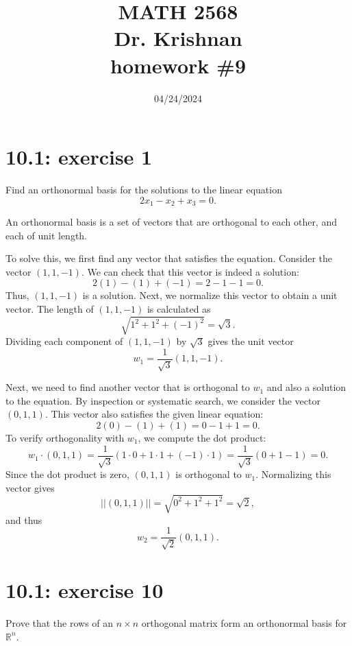 \documentclass{report}
\title{\Huge{MATH 2568}\\\huge{Dr. Krishnan}\\homework \#9}
\author{\Huge{\mylink{https://www.sohumsuthar.com}{Sohum Suthar}}}
\date{\huge {04/24/2024}}
\begin{document}
\maketitle
\newpage
{}	
\tableofcontents
\pagebreak





\section*{10.1: exercise 1} 

Find an orthonormal basis for the solutions to the linear equation
\[
2x_1 - x_2 + x_3 = 0.
\]


\sol

An orthonormal basis is a set of vectors that are orthogonal to each other, and each of unit length. 

To solve this, we first find any vector that satisfies the equation. Consider the vector $(1,1,-1)$. We can check that this vector is indeed a solution:
\[
2(1) - (1) + (-1) = 2 - 1 - 1 = 0.
\]
Thus, $(1,1,-1)$ is a solution. Next, we normalize this vector to obtain a unit vector. The length of $(1,1,-1)$ is calculated as
\[
\sqrt{1^2 + 1^2 + (-1)^2} = \sqrt{3}.
\]
Dividing each component of $(1,1,-1)$ by $\sqrt{3}$ gives the unit vector 
\[
w_1 = \frac{1}{\sqrt{3}}(1,1,-1).
\]

Next, we need to find another vector that is orthogonal to $w_1$ and also a solution to the equation. By inspection or systematic search, we consider the vector $(0,1,1)$. This vector also satisfies the given linear equation:
\[
2(0) - (1) + (1) = 0 - 1 + 1 = 0.
\]
To verify orthogonality with $w_1$, we compute the dot product:
\[
w_1 \cdot (0,1,1) = \frac{1}{\sqrt{3}}(1 \cdot 0 + 1 \cdot 1 + (-1) \cdot 1) = \frac{1}{\sqrt{3}}(0 + 1 - 1) = 0.
\]
Since the dot product is zero, $(0,1,1)$ is orthogonal to $w_1$. Normalizing this vector gives
\[
|| (0,1,1) || = \sqrt{0^2 + 1^2 + 1^2} = \sqrt{2},
\]
and thus
\[
w_2 = \frac{1}{\sqrt{2}}(0,1,1).
\]



\section*{10.1: exercise 10} 

Prove that the rows of an $n \times n$ orthogonal matrix form an orthonormal basis for $\mathbb{R}^n$. \\
\end{document}
